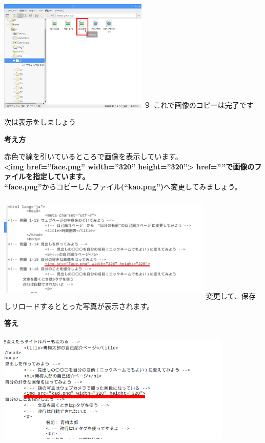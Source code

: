 \documentclass[a4paper,12pt]{jarticle}
\begin{document}
\bigskip

\bigskip

\begin{minipage}{7.559cm}
\includegraphics[width=7.087cm,height=5.332cm]{textbook-img170.png}
	\newline
９ これで画像のコピーは完了です

次は表示をしましょう
\end{minipage}


\clearpage
\flushleft
\textbf{考え方}\ \ 


赤色で線を引いているところで画像を表示しています。\\
\textbf{{\textless}img href=”face.png” width=”320” height=”320”{\textgreater}}
\textbf{href=””で画像のファイルを指定しています。}\\
\textbf{“face.png”}からコピーしたファイル\textbf{(“kao.png”)}へ変更してみましょう。

\begin{minipage}{16.576cm}
\includegraphics[width=10.296cm,height=5.145cm]{textbook-img171.png}
\newline
変更して、保存しリロードするととった写真が表示されます。
\end{minipage}

\flushleft
\textbf{答え}

\includegraphics[width=11.255cm,height=5.482cm]{textbook-img172.png}
\end{document}
